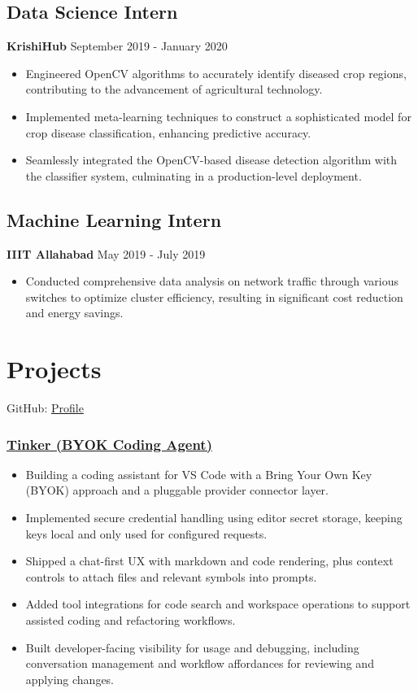 \documentclass[11pt,a4paper]{article}
\begin{document}
\subsection*{Data Science Intern}
\textbf{KrishiHub} \hfill September 2019 - January 2020\\
\begin{itemize}
    \item Engineered OpenCV algorithms to accurately identify diseased crop regions, contributing to the advancement of agricultural technology.
    \item Implemented meta-learning techniques to construct a sophisticated model for crop disease classification, enhancing predictive accuracy.
    \item Seamlessly integrated the OpenCV-based disease detection algorithm with the classifier system, culminating in a production-level deployment.
\end{itemize}

\subsection*{Machine Learning Intern}
\textbf{IIIT Allahabad} \hfill May 2019 - July 2019\\
\begin{itemize}
    \item Conducted comprehensive data analysis on network traffic through various switches to optimize cluster efficiency, resulting in significant cost reduction and energy savings.
\end{itemize}

\section*{Projects}
\noindent GitHub: \href{https://github.com/vatsalsaglani}{Profile}\\[0.5em]
\subsubsection*{\href{https://github.com/vatsalsaglani/tinker}{Tinker (BYOK Coding Agent)}}
\begin{itemize}
    \item Building a coding assistant for VS Code with a Bring Your Own Key (BYOK) approach and a pluggable provider connector layer.
    \item Implemented secure credential handling using editor secret storage, keeping keys local and only used for configured requests.
    \item Shipped a chat-first UX with markdown and code rendering, plus context controls to attach files and relevant symbols into prompts.
    \item Added tool integrations for code search and workspace operations to support assisted coding and refactoring workflows.
    \item Built developer-facing visibility for usage and debugging, including conversation management and workflow affordances for reviewing and applying changes.
\end{itemize}
\end{document}
